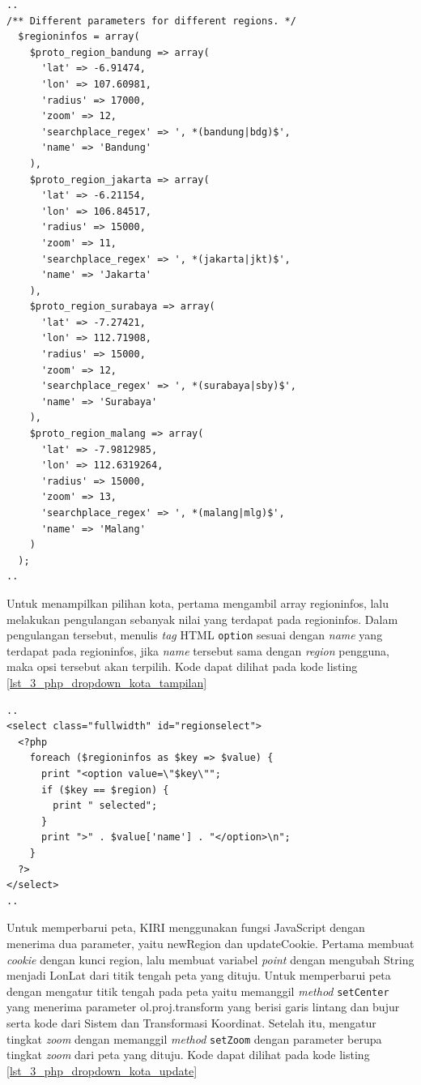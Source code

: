 \documentclass[a4paper,twoside]{article}
\begin{document}
\begin{enumerate}
\begin{lstlisting}[caption=Deklarasi variabel regioninfos,label = {lst_3_php_dropdown_kota_regioninfos}]
..
/** Different parameters for different regions. */
  $regioninfos = array(
    $proto_region_bandung => array(
      'lat' => -6.91474,
      'lon' => 107.60981,
      'radius' => 17000,
      'zoom' => 12,
      'searchplace_regex' => ', *(bandung|bdg)$',
      'name' => 'Bandung'
    ),
    $proto_region_jakarta => array(
      'lat' => -6.21154,
      'lon' => 106.84517,
      'radius' => 15000,
      'zoom' => 11,
      'searchplace_regex' => ', *(jakarta|jkt)$',
      'name' => 'Jakarta'
    ),
    $proto_region_surabaya => array(
      'lat' => -7.27421,
      'lon' => 112.71908,
      'radius' => 15000,
      'zoom' => 12,
      'searchplace_regex' => ', *(surabaya|sby)$',
      'name' => 'Surabaya'
    ),
    $proto_region_malang => array(
      'lat' => -7.9812985,
      'lon' => 112.6319264,
      'radius' => 15000,
      'zoom' => 13,
      'searchplace_regex' => ', *(malang|mlg)$',
      'name' => 'Malang'        
    )
  );
..
\end{lstlisting}

Untuk menampilkan pilihan kota, pertama mengambil array regioninfos, lalu melakukan pengulangan sebanyak nilai yang terdapat pada regioninfos. Dalam pengulangan tersebut, menulis \textit{tag} HTML \verb!option! sesuai dengan \textit{name} yang terdapat pada regioninfos, jika \textit{name} tersebut sama dengan \textit{region} pengguna, maka opsi tersebut akan terpilih. Kode dapat dilihat pada kode listing \ref{lst_3_php_dropdown_kota_tampilan}

\begin{lstlisting}[caption=Menampilkan pilihan kota kepada pengguna ,label = {lst_3_php_dropdown_kota_tampilan}]
..
<select class="fullwidth" id="regionselect">
  <?php
    foreach ($regioninfos as $key => $value) {
      print "<option value=\"$key\"";
      if ($key == $region) {
        print " selected";
      }
      print ">" . $value['name'] . "</option>\n";
    }
  ?>
</select>
..
\end{lstlisting}

Untuk memperbarui peta, KIRI menggunakan fungsi JavaScript dengan menerima dua parameter, yaitu newRegion dan updateCookie. Pertama membuat \textit{cookie} dengan kunci region, lalu membuat variabel \textit{point} dengan mengubah String menjadi LonLat dari titik tengah peta yang dituju. Untuk memperbarui peta dengan mengatur titik tengah pada peta yaitu memanggil \textit{method} \verb!setCenter! yang menerima parameter ol.proj.transform yang berisi garis lintang dan bujur serta kode dari Sistem  dan Transformasi  Koordinat. Setelah itu, mengatur tingkat \textit{zoom} dengan memanggil \textit{method} \verb!setZoom! dengan parameter berupa tingkat \textit{zoom} dari peta yang dituju. Kode dapat dilihat pada kode listing \ref{lst_3_php_dropdown_kota_update}


\end{enumerate}
\end{document}
